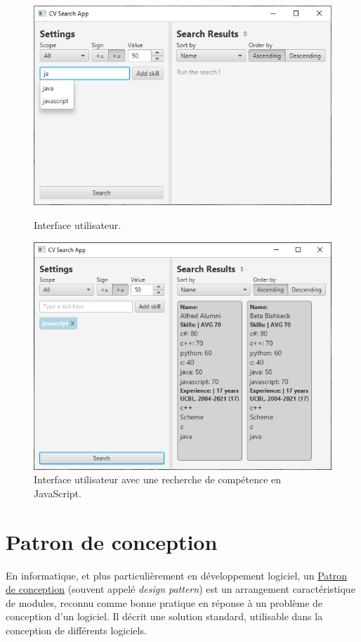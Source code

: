 \documentclass{article}
\begin{document}
\begin{figure}[!tbp]
\centering
\begin{minipage}[b]{1\textwidth}
    \includegraphics[width=\textwidth]{UI-CV-search.PNG}
    \caption{\label{fig:UI-CV-search}Interface utilisateur.}
    \end{minipage}
\begin{minipage}[b]{1\textwidth}
    \includegraphics[width=\textwidth]{VC-searched.PNG}
    \caption{\label{fig:UI-Search}Interface utilisateur avec une recherche de compétence en JavaScript.}
    \end{minipage}
\end{figure}
\newpage
\section{Patron de conception}
En informatique, et plus particulièrement en développement logiciel, un \href{https://fr.wikipedia.org/wiki/Patron_de_conception}{Patron de conception} (souvent appelé \textit{design pattern}) est un arrangement caractéristique de modules, reconnu comme bonne pratique en réponse à un problème de conception d'un logiciel. Il décrit une solution standard, utilisable dans la conception de différents logiciels.
\end{document}

